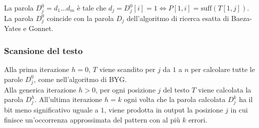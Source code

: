 La parola $D^0_j = d_1 \dots d_m$ è tale che $d_j = D^0_j[i] = 1 \iff P[1,i] = \mbox{suff}(T[1,j])$.\\
La parola $D^0_j$ coincide con la parola $D_j$ dell’algoritmo di ricerca esatta di Baeza-Yates e Gonnet.

\subsubsection{Scansione del testo}
Alla prima iterazione $h = 0$, $T$ viene scandito per $j$ da $ 1$ a $n$ per calcolare tutte le parole $D^0_j$, come nell’algoritmo di BYG.\\

Alla generica iterazione $h > 0$, per ogni posizione $j$ del testo $T$ viene calcolata la parola $D^h_j$. All’ultima iterazione $h=k$ ogni volta che la parola calcolata $D^k_j$ ha il bit meno significativo uguale a $1$, viene prodotta in output la posizione $j$ in cui finisce un’occorrenza approssimata del pattern con al più $k$ errori.\\

